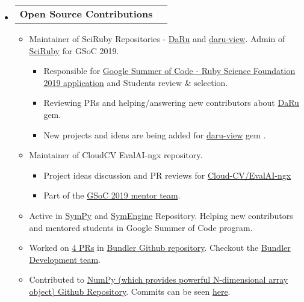 \documentclass[letterpaper,12pt]{article}[leftmargin=*]
\makeatletter
\def \entryspacing {-0pt}
\newcommand{\resumeEntryStart}{\begin{itemize}[leftmargin=2.5mm]}
\newcommand{\resumeEntryEnd}{\end{itemize}\vspace{\entryspacing}}
\newcommand{\resumeItemListStart}{\begin{itemize}[leftmargin=4.5mm]}
\newcommand{\resumeItemListEnd}{\end{itemize}}
\newcommand{\resumeItem}[1]{
  \item\small{
    {#1 \vspace{-2pt}}
  }
}
\newcommand{\resumeEntryTD}[2]{
  \vspace{-1pt}\item[]
    \begin{tabular*}{0.97\textwidth}{l@{\extracolsep{\fill}}r}
      \textbf{\color{primary}#1} & {\firabook\color{accent}\small#2} \\
    \end{tabular*}\vspace{-6pt}
}
\makeatother
\begin{document}
  \resumeEntryStart
    \resumeEntryTD
      {Open Source Contributions}{}
    \resumeItemListStart
      \resumeItem {Maintainer of SciRuby Repositories - \href{https://github.com/SciRuby/daru/}{DaRu} and \href{https://github.com/SciRuby/daru-view/}{daru-view}. Admin of \href{https://github.com/SciRuby/}{SciRuby} for GSoC 2019.
        \begin{itemize}
            \item Responsible for \href{https://github.com/SciRuby/sciruby/wiki/Google-Summer-of-Code-2019-Ideas}{Google Summer of Code - Ruby Science Foundation 2019 application} and Students review & selection.

            \item Reviewing PRs and helping/answering new contributors about
            \href{https://github.com/SciRuby/daru/}{DaRu} gem.

            \item New projects and ideas are being added for \href{https://github.com/SciRuby/daru-view/}{daru-view} gem .
        \end{itemize}
      }
      \resumeItem {Maintainer of CloudCV EvalAI-ngx repository.
        \begin{itemize}
            \item Project ideas discussion and PR reviews for \href{https://github.com/Cloud-CV/EvalAI-ngx}{Cloud-CV/EvalAI-ngx}

            \item Part of the \href{https://cloudcv.org/team}{GSoC 2019 mentor team}.

        \end{itemize}
      }

      \resumeItem {Active in \href{https://github.com/sympy/sympy}{SymPy} and \href{https://github.com/symengine/symengine}{SymEngine} Repository. Helping new contributors and mentored students in Google Summer of Code program.}

      \resumeItem {Worked on \href{https://github.com/bundler/bundler/commits?author=Shekharrajak}{4 PRs} in \href{https://github.com/bundler/bundler/}{Bundler Github repository}. Checkout the \href{https://bundler.io/contributors.html}{Bundler Development team}.}

      \resumeItem {Contributed to \href{https://github.com/numpy/numpy/}{NumPy (which provides powerful N-dimensional array object) Github Repository}. Commits can be seen \href{https://github.com/numpy/numpy/commits?author=Shekharrajak}{here}.}
    \resumeItemListEnd
  \resumeEntryEnd
\end{document}
